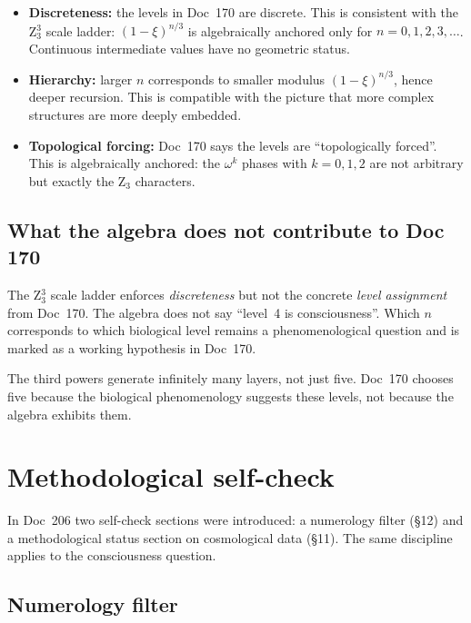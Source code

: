 \begin{itemize}
\item \textbf{Discreteness:} the levels in Doc~170 are discrete. This is consistent with the Z$_3^3$ scale ladder: $(1-\xi)^{n/3}$ is algebraically anchored only for $n = 0, 1, 2, 3, \dots$. Continuous intermediate values have no geometric status.
\item \textbf{Hierarchy:} larger $n$ corresponds to smaller modulus $(1-\xi)^{n/3}$, hence deeper recursion. This is compatible with the picture that more complex structures are more deeply embedded.
\item \textbf{Topological forcing:} Doc~170 says the levels are ``topologically forced''. This is algebraically anchored: the $\omega^k$ phases with $k = 0, 1, 2$ are not arbitrary but exactly the Z$_3$ characters.
\end{itemize}

\subsection{What the algebra does not contribute to Doc 170}

\begin{important}
The Z$_3^3$ scale ladder enforces \emph{discreteness} but not the concrete \emph{level assignment} from Doc~170. The algebra does not say ``level~4 is consciousness''. Which $n$ corresponds to which biological level remains a phenomenological question and is marked as a working hypothesis in Doc~170.
\end{important}

The third powers generate infinitely many layers, not just five. Doc~170 chooses five because the biological phenomenology suggests these levels, not because the algebra exhibits them.

\section{Methodological self-check}\label{sec:methodology}

In Doc~206 two self-check sections were introduced: a numerology filter (\S12) and a methodological status section on cosmological data (\S11). The same discipline applies to the consciousness question.

\subsection{Numerology filter}

